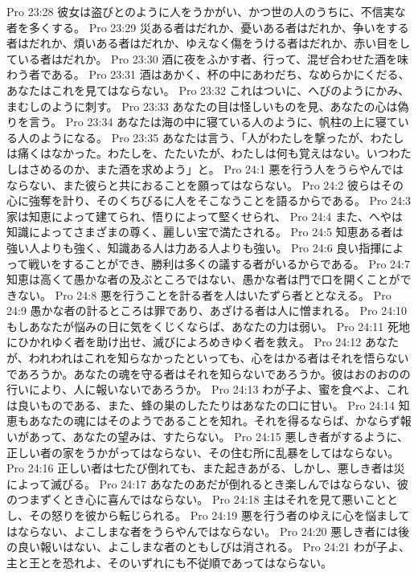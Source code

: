 Pro 23:28  彼女は盗びとのように人をうかがい、かつ世の人のうちに、不信実な者を多くする。
Pro 23:29  災ある者はだれか、憂いある者はだれか、争いをする者はだれか、煩いある者はだれか、ゆえなく傷をうける者はだれか、赤い目をしている者はだれか。
Pro 23:30  酒に夜をふかす者、行って、混ぜ合わせた酒を味わう者である。
Pro 23:31  酒はあかく、杯の中にあわだち、なめらかにくだる、あなたはこれを見てはならない。
Pro 23:32  これはついに、へびのようにかみ、まむしのように刺す。
Pro 23:33  あなたの目は怪しいものを見、あなたの心は偽りを言う。
Pro 23:34  あなたは海の中に寝ている人のように、帆柱の上に寝ている人のようになる。
Pro 23:35  あなたは言う、「人がわたしを撃ったが、わたしは痛くはなかった。わたしを、たたいたが、わたしは何も覚えはない。いつわたしはさめるのか、また酒を求めよう」と。
Pro 24:1  悪を行う人をうらやんではならない、また彼らと共におることを願ってはならない。
Pro 24:2  彼らはその心に強奪を計り、そのくちびるに人をそこなうことを語るからである。
Pro 24:3  家は知恵によって建てられ、悟りによって堅くせられ、
Pro 24:4  また、へやは知識によってさまざまの尊く、麗しい宝で満たされる。
Pro 24:5  知恵ある者は強い人よりも強く、知識ある人は力ある人よりも強い。
Pro 24:6  良い指揮によって戦いをすることができ、勝利は多くの議する者がいるからである。
Pro 24:7  知恵は高くて愚かな者の及ぶところではない、愚かな者は門で口を開くことができない。
Pro 24:8  悪を行うことを計る者を人はいたずら者ととなえる。
Pro 24:9  愚かな者の計るところは罪であり、あざける者は人に憎まれる。
Pro 24:10  もしあなたが悩みの日に気をくじくならば、あなたの力は弱い。
Pro 24:11  死地にひかれゆく者を助け出せ、滅びによろめきゆく者を救え。
Pro 24:12  あなたが、われわれはこれを知らなかったといっても、心をはかる者はそれを悟らないであろうか。あなたの魂を守る者はそれを知らないであろうか。彼はおのおのの行いにより、人に報いないであろうか。
Pro 24:13  わが子よ、蜜を食べよ、これは良いものである、また、蜂の巣のしたたりはあなたの口に甘い。
Pro 24:14  知恵もあなたの魂にはそのようであることを知れ。それを得るならば、かならず報いがあって、あなたの望みは、すたらない。
Pro 24:15  悪しき者がするように、正しい者の家をうかがってはならない、その住む所に乱暴をしてはならない。
Pro 24:16  正しい者は七たび倒れても、また起きあがる、しかし、悪しき者は災によって滅びる。
Pro 24:17  あなたのあだが倒れるとき楽しんではならない、彼のつまずくとき心に喜んではならない。
Pro 24:18  主はそれを見て悪いこととし、その怒りを彼から転じられる。
Pro 24:19  悪を行う者のゆえに心を悩ましてはならない、よこしまな者をうらやんではならない。
Pro 24:20  悪しき者には後の良い報いはない、よこしまな者のともしびは消される。
Pro 24:21  わが子よ、主と王とを恐れよ、そのいずれにも不従順であってはならない。
